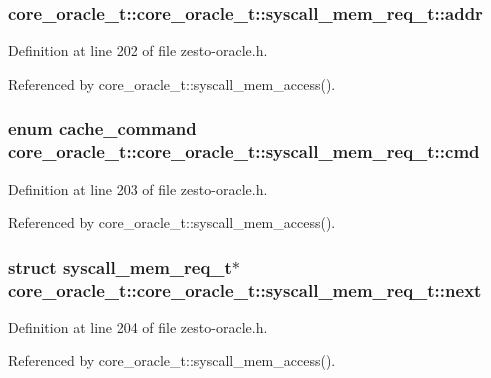 \subsubsection[{addr}]{ core\_\-oracle\_\-t::core\_\-oracle\_\-t::syscall\_\-mem\_\-req\_\-t::addr}\label{structcore__oracle__t_1_1syscall__mem__req__t_eccaddae80488cb6b3851a8a257e268d}




Definition at line 202 of file zesto-oracle.h.

Referenced by core\_\-oracle\_\-t::syscall\_\-mem\_\-access().
\subsubsection[{cmd}]{\setlength{\rightskip}{0pt plus 5cm}enum {\bf cache\_\-command} core\_\-oracle\_\-t::core\_\-oracle\_\-t::syscall\_\-mem\_\-req\_\-t::cmd}\label{structcore__oracle__t_1_1syscall__mem__req__t_7e5aefa4c37d59dce5e49925b902d283}




Definition at line 203 of file zesto-oracle.h.

Referenced by core\_\-oracle\_\-t::syscall\_\-mem\_\-access().
\subsubsection[{next}]{\setlength{\rightskip}{0pt plus 5cm}struct {\bf syscall\_\-mem\_\-req\_\-t}$\ast$ core\_\-oracle\_\-t::core\_\-oracle\_\-t::syscall\_\-mem\_\-req\_\-t::next\hspace{0.3cm}{\tt  [read]}}\label{structcore__oracle__t_1_1syscall__mem__req__t_c50033a7073082da37aeaa3983e8b0ad}




Definition at line 204 of file zesto-oracle.h.

Referenced by core\_\-oracle\_\-t::syscall\_\-mem\_\-access().
